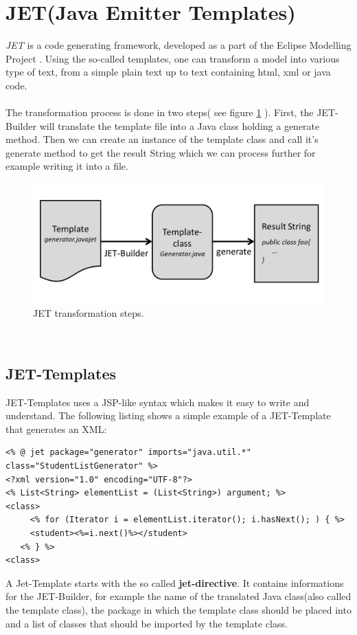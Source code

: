 \section{JET(Java Emitter Templates)}
\textit{JET}\cite{JETWEB} is a code generating framework, developed as a part of the Eclipse Modelling Project \cite{EMPWEB}. Using the so-called templates, one can transform a model into various type of text, from a simple plain text up to text containing html, xml or java code.\\\\
The transformation process is done in two steps( see figure \ref{fig:jet_process} ). First, the JET-Builder will translate the template file into a Java class holding a generate method. Then we can create an instance of the template class and call it's generate method to get the result String which we can process further for example writing it into a file. 
\begin{figure}[h]
  \label{fig:jet_process}
	\centering
		\includegraphics[width=1.0\textwidth]{images/jet_process.png}
	\caption{JET transformation steps.}
\end{figure}\\

\subsection{JET-Templates}
JET-Templates uses a JSP-like syntax which makes it easy to write and understand. The following listing shows a simple example of a JET-Template that generates an XML:
\begin{lstlisting}[caption = a simple JET-Template]
<% @ jet package="generator" imports="java.util.*" class="StudentListGenerator" %> 
<?xml version="1.0" encoding="UTF-8"?>
<% List<String> elementList = (List<String>) argument; %>
<class>
	 <% for (Iterator i = elementList.iterator(); i.hasNext(); ) { %>
     <student><%=i.next()%></student>
   <% } %>
<class>
\end{lstlisting}
A Jet-Template starts with the so called \textbf{jet-directive}. It contains informations for the JET-Builder, for example the name of the translated Java class(also called the template class), the package in which the template class should be placed into and a list of classes that should be imported by the template class.


